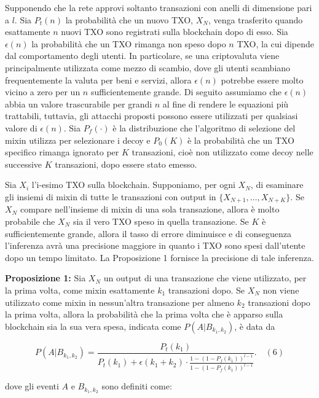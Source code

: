 Supponendo che la rete approvi soltanto transazioni con anelli di dimensione pari a $l$. Sia \( P_t(n) \) la probabilità che un nuovo TXO, \( X_N \), venga trasferito quando esattamente \( n \) nuovi TXO sono registrati sulla blockchain dopo di esso. Sia $\epsilon(n)$ la probabilità che un TXO rimanga non speso dopo $n$ TXO, la cui dipende dal comportamento degli utenti. In particolare, se una criptovaluta viene principalmente utilizzata come mezzo di scambio, dove gli utenti scambiano frequentemente la valuta per beni e servizi, allora \(\epsilon(n)\) potrebbe essere molto vicino a zero per un \( n \) sufficientemente grande. Di seguito assumiamo che \(\epsilon(n)\) abbia un valore trascurabile per grandi \( n \) al fine di rendere le equazioni più trattabili, tuttavia, gli attacchi proposti possono essere utilizzati per qualsiasi valore di \(\epsilon(n)\).  Sia \( P_f(\cdot) \) è la distribuzione che l'algoritmo di selezione del mixin utilizza per selezionare i decoy e $P_{0}(K)$ è la probabilità che un TXO specifico rimanga ignorato per $K$ transazioni, cioè non utilizzato come decoy nelle successive $K$ transazioni, dopo essere stato emesso.

Sia \( X_i \) l'i-esimo TXO sulla blockchain. Supponiamo, per ogni \( X_N \), di esaminare gli insiemi di mixin di tutte le transazioni con output in \( \{X_{N+1}, \dots, X_{N+K}\} \). Se \( X_N \) compare nell'insieme di mixin di una sola transazione, allora è molto probabile che \( X_N \) sia il vero TXO speso in quella transazione. Se \( K \) è sufficientemente grande, allora il tasso di errore diminuisce e di conseguenza l'inferenza avrà una precisione maggiore in quanto i TXO sono spesi dall'utente dopo un tempo limitato. La Proposizione 1 fornisce la precisione di tale inferenza.

\textbf{Proposizione 1:} Sia \( X_N \) un output di una transazione che viene utilizzato, per la prima volta, come mixin esattamente \( k_1 \) transazioni dopo. Se \( X_N \) non viene utilizzato come mixin in nessun'altra transazione per almeno \( k_2 \) transazioni dopo la prima volta, allora la probabilità che la prima volta che è apparso sulla blockchain sia la sua vera spesa, indicata come \( P(A|B_{k_1,k_2}) \), è data da

\[ P(A|B_{k_1,k_2}) = \frac{P_t(k_1)}{P_t(k_1) + \epsilon(k_1 + k_2) \cdot \frac{1 - (1 - P_f(k_1))^{l-1}}{1 - (1 - P_f(k_1))^{l-1}}}. \quad (6) \]

dove gli eventi \( A \) e \( B_{k_1,k_2} \) sono definiti come:

